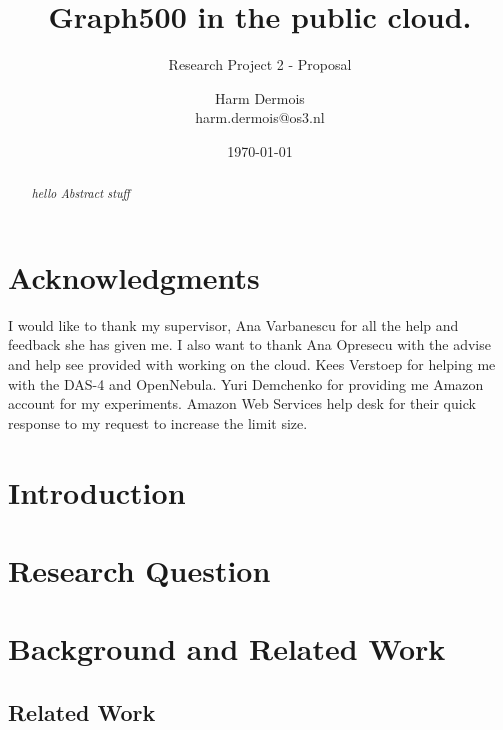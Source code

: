 \documentclass[A4]{scrartcl}
\begin{document}
\title{Graph500 in the public cloud.}
\subtitle{Research Project 2 - Proposal}
\date{\today}
\author{Harm Dermois \\ harm.dermois@os3.nl}

\maketitle
\newpage


\begin{abstract}
\textit{hello Abstract stuff}
\end{abstract}

\newpage

\section*{Acknowledgments}
I would like to thank my supervisor, Ana Varbanescu for all the help and feedback she has given me. I also want to thank Ana Opresecu with the advise and help see provided with working on the cloud. Kees Verstoep for helping me with the DAS-4 and OpenNebula. Yuri Demchenko for providing me Amazon account for my experiments. Amazon Web Services help desk for their quick response to my request to increase the limit size.

\tableofcontents
\newpage




\section{Introduction}
\label{sec:introduction}



\section{Research Question}
\label{research-questions}


%

\section{Background and Related Work}
\label{background}


\subsection{Related Work}
\label{related-work}

\end{document}
